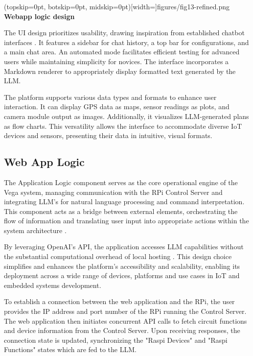 \documentclass{ieeeaccess}
\begin{document}
\Figure[t!](topskip=0pt, botskip=0pt,
midskip=0pt)[width=\textwidth]{{figures/fig13-refined.png}}
{ \textbf{Webapp logic design}\label{fig5}}


The UI design prioritizes usability, drawing inspiration from established chatbot interfaces \cite{OpenAI_GPT}. It features a sidebar for chat history, a top bar for configurations, and a main chat area. An automated mode facilitates efficient testing for advanced users while maintaining simplicity for novices. The interface incorporates a Markdown renderer to appropriately display formatted text generated by the LLM.


The platform supports various data types and formats to enhance user interaction. It can display GPS data as maps, sensor readings as plots, and camera module output as images. Additionally, it visualizes LLM-generated plans as flow charts. This versatility allows the interface to accommodate diverse IoT devices and sensors, presenting their data in intuitive, visual formats.


\subsection{Web App Logic}
The Application Logic component serves as the core operational engine of the Vega system, managing communication with the RPi Control Server and integrating LLM's for natural language processing and command interpretation. This component acts as a bridge between external elements, orchestrating the flow of information and translating user input into appropriate actions within the system architecture \cite{taylor2010software}.

By leveraging OpenAI's API, the application accesses LLM capabilities without the substantial computational overhead of local hosting \cite{kim2024llmemestimatinggpumemory}. This design choice simplifies and enhances the platform's accessibility and scalability, enabling its deployment across a wide range of devices, platforms and use cases in IoT and embedded systems development.

To establish a connection between the web application and the RPi, the user provides the IP address and port number of the RPi running the Control Server. The web application then initiates concurrent API calls to fetch circuit functions and device information from the Control Server. Upon receiving responses, the connection state is updated, synchronizing the "Raspi Devices" and "Raspi Functions" states which are fed to the LLM.
\end{document}
